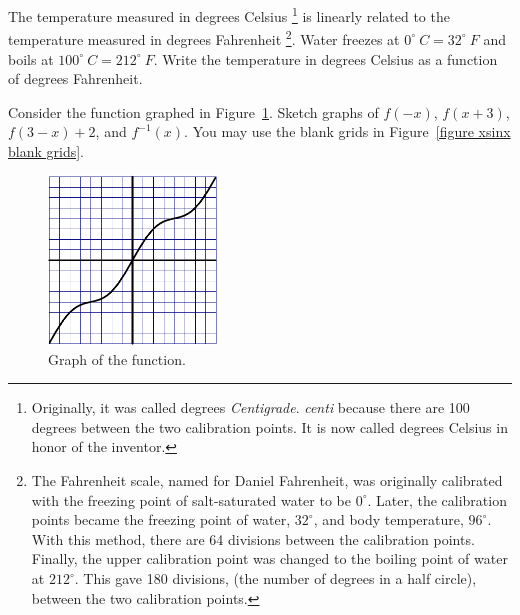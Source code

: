 {\begin{Exercise}
\label{exercise fahrenheit celcius}
The temperature measured in degrees Celsius 
\footnote{
  Originally, it was called degrees \textit{Centigrade}.  
  \textit{centi} because there are 100 degrees between the two 
  calibration points.  It is now called degrees Celsius in honor of the 
  inventor.
}
is linearly related to 
the temperature measured in degrees Fahrenheit
\footnote{
  The Fahrenheit scale, named for Daniel Fahrenheit,
  was originally calibrated with the freezing point of 
  salt-saturated water to be $0^\circ $.  Later, the calibration points 
  became the freezing point of water, $32^\circ$, and body temperature,
  $96^\circ$.  With this method, there are 64 divisions between the calibration
  points.  Finally, the upper calibration point was changed to the boiling
  point of water at $212^\circ$.  This gave 180 divisions, (the number of 
  degrees in a half circle), between the two calibration points.
}.
Water freezes at $0^\circ\ C = 32^\circ\ F$ and boils at 
$100^\circ\ C = 212^\circ\ F$.  Write the temperature in degrees Celsius
as a function of degrees Fahrenheit.

\end{Exercise}








\begin{Exercise}
\label{exercise xsinx transform}
Consider the function graphed in Figure~\ref{figure xsinx}.
Sketch graphs of $f(-x)$, $f(x+3)$, $f(3-x)+2$, and $f^{-1}(x)$.
You may use the blank grids in Figure~\ref{figure xsinx blank grids}.

\begin{figure}[h!]
\begin{center}
\includegraphics[width=0.4\textwidth]{algebra/sets/xsinx}
\end{center}
\caption{Graph of the function.}
\label{figure xsinx}
\end{figure}


\end{Exercise}}
